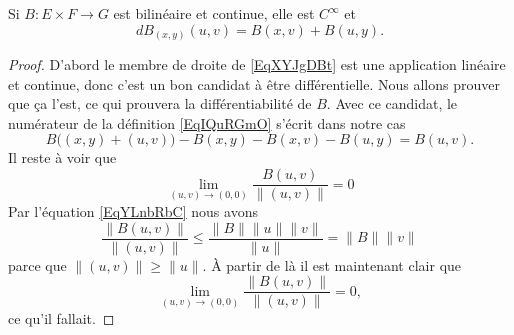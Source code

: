 \begin{lemma}\label{LemFRdNDCd}
    Si \( B\colon E\times F\to G\) est bilinéaire et continue, elle est \(  C^{\infty}\) et
    \begin{equation}    \label{EqXYJgDBt}
        dB_{(x,y)}(u,v)=B(x,v)+B(u,y).
    \end{equation}
\end{lemma}

\begin{proof}
    D'abord le membre de droite de \eqref{EqXYJgDBt} est une application linéaire et continue, donc c'est un bon candidat à être différentielle. Nous allons prouver que ça l'est, ce qui prouvera la différentiabilité de \( B\). Avec ce candidat, le numérateur de la définition \eqref{EqIQuRGmO} s'écrit dans notre cas
    \begin{equation}
        B\big( (x,y)+(u,v) \big)-B(x,y)-B(x,v)-B(u,y)=B(u,v).
    \end{equation}
    Il reste à voir que 
    \begin{equation}
        \lim_{ (u,v)\to (0,0) } \frac{ B(u,v) }{ \| (u,v) \| }=0
    \end{equation}
    Par l'équation \eqref{EqYLnbRbC} nous avons
    \begin{equation}
        \frac{ \| B(u,v) \| }{ \| (u,v) \| }\leq \frac{ \| B \|\| u \|\| v \| }{ \| u \| }=\| B \|\| v \|
    \end{equation}
    parce que \( \| (u,v) \|\geq \| u \|\). À partir de là il est maintenant clair que
    \begin{equation}
        \lim_{(u,v)\to (0,0)}\frac{ \| B(u,v) \| }{ \| (u,v) \| }=0,
    \end{equation}
    ce qu'il fallait.
\end{proof}

